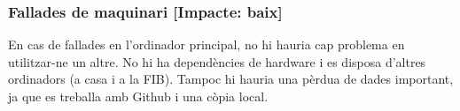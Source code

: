 	\subsubsection{Fallades de maquinari [Impacte: baix]}
		En cas de fallades en l'ordinador principal, no hi hauria cap problema en utilitzar-ne un altre. No hi ha dependències de hardware i es disposa d'altres ordinadors (a casa i a la FIB).
		Tampoc hi hauria una pèrdua de dades important, ja que es treballa amb Github i una còpia local.
